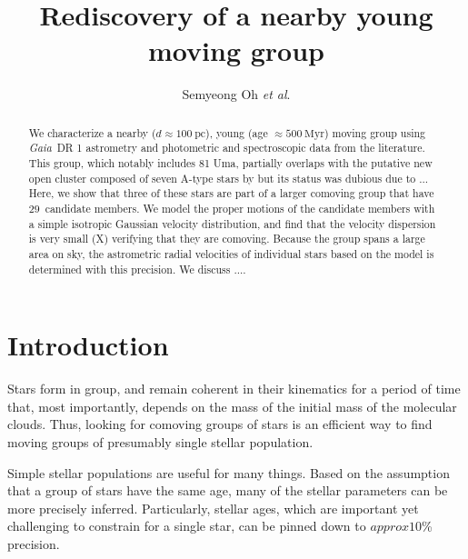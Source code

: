 \documentclass[modern,letterpaper]{aastex61}
\newcommand{\project}[1]{\textsl{#1}}
\newcommand{\gaia}{\project{Gaia}}
\newcommand{\etal}{\textit{et al}.}
\newcommand{\todo}[1]{{\color{crimson}#1}}
\newcommand{\groupDistanceEstimate}{\ensuremath{100~\mathrm{pc}}}
\newcommand{\groupAgeEstimate}{\ensuremath{500~\mathrm{Myr}}}
\newcommand{\totalNumberOfCandidates}{\ensuremath{29}}
\begin{document}
\sloppy\sloppypar\raggedbottom\frenchspacing %

\title{
  Rediscovery of a nearby young moving group
}

\author[0000-0001-7790-5308]{Semyeong Oh \etal}


\begin{abstract}

  We characterize a nearby (\todo{$d \approx \groupDistanceEstimate$}),
  young (\todo{age $\approx \groupAgeEstimate$}) moving group using \gaia\ DR 1
  astrometry and photometric and spectroscopic data from the literature.
  This group, which notably includes \todo{81 Uma},
  partially overlaps with the putative new open cluster composed of
  seven A-type stars by \citet{1977ATsir.969....7L} but its status
  was dubious due to ...
  Here, we show that three of these stars are part of a larger comoving group
  that have \totalNumberOfCandidates\ candidate members.
  We model the proper motions of the candidate members with a simple
  isotropic Gaussian velocity distribution, and find that
  the velocity dispersion is very small (\todo{X}) verifying
  that they are comoving.
  Because the group spans a large area on sky, the astrometric radial velocities
  of individual stars based on the model is determined with \todo{this precision}.
  We discuss ....

\end{abstract}

\section{Introduction} %
\label{sec:introduction}

Stars form in group, and remain coherent in their kinematics for a period of
time that, most importantly, depends on the mass of the initial mass of the
molecular clouds. Thus, looking for comoving groups of stars is an efficient
way to find moving groups of presumably single stellar population.

Simple stellar populations are useful for many things. Based on the assumption
that a group of stars have the same age, many of the stellar parameters can be
more precisely inferred. Particularly, stellar ages, which are important yet
challenging to constrain for a single star, can be pinned down to
\todo{$approx 10$\%} precision.
\end{document}
